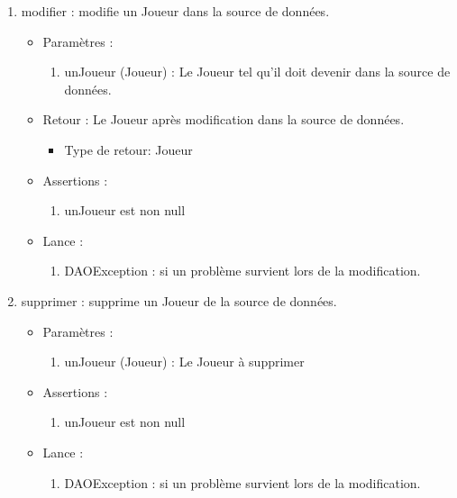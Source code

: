 \begin{itemize}
\begin{enumerate}
  \item modifier : modifie un Joueur dans la source de données.
    \begin{itemize}
    \item Paramètres : 
      \begin{enumerate}
      \item unJoueur (Joueur) : Le Joueur tel qu'il doit devenir dans la source de données.
      \end{enumerate}
    \item Retour : Le Joueur après modification dans la source de données.
      \begin{itemize}
      \item Type de retour: Joueur
      \end{itemize}
    \item Assertions : 
      \begin{enumerate}
      \item unJoueur est non null
      \end{enumerate}
    \item Lance :
      \begin{enumerate}
      \item DAOException : si un problème survient lors de la modification.
      \end{enumerate}
    \end{itemize}
    
  \item supprimer : supprime un Joueur de la source de données.
    \begin{itemize}
    \item Paramètres : 
      \begin{enumerate}
      \item unJoueur (Joueur) : Le Joueur à supprimer
      \end{enumerate}
    \item Assertions : 
      \begin{enumerate}
      \item unJoueur est non null
      \end{enumerate}
    \item Lance :
      \begin{enumerate}
      \item DAOException : si un problème survient lors de la modification.
      \end{enumerate}
    \end{itemize}


\end{enumerate}
\end{itemize}
